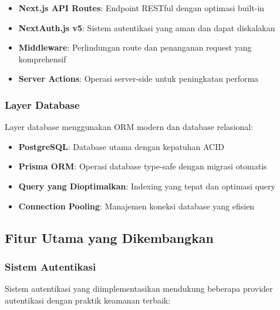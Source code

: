 \begin{itemize}
\item \textbf{Next.js API Routes}: Endpoint RESTful dengan optimasi built-in
\item \textbf{NextAuth.js v5}: Sistem autentikasi yang aman dan dapat diskalakan
\item \textbf{Middleware}: Perlindungan route dan penanganan request yang komprehensif
\item \textbf{Server Actions}: Operasi server-side untuk peningkatan performa
\end{itemize}

\subsubsection{Layer Database}

Layer database menggunakan ORM modern dan database relasional:

\begin{itemize}
\item \textbf{PostgreSQL}: Database utama dengan kepatuhan ACID
\item \textbf{Prisma ORM}: Operasi database type-safe dengan migrasi otomatis
\item \textbf{Query yang Dioptimalkan}: Indexing yang tepat dan optimasi query
\item \textbf{Connection Pooling}: Manajemen koneksi database yang efisien
\end{itemize}

\subsection{Fitur Utama yang Dikembangkan}

\subsubsection{Sistem Autentikasi}

Sistem autentikasi yang diimplementasikan mendukung beberapa provider autentikasi dengan praktik keamanan terbaik:

